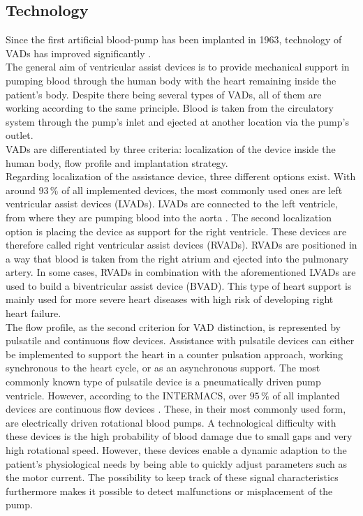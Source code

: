 \subsection{Technology}
Since the first artificial blood-pump has been implanted in 1963, technology of VADs has improved significantly \cite{VAD9}.
\\The general aim of ventricular assist devices is to provide mechanical support in pumping blood through the human body with the heart remaining inside the patient's body. Despite there being several types of VADs, all of them are working according to the same principle. Blood is taken from the circulatory system through the pump's inlet and ejected at another location via the pump's outlet. \cite{VAD1}
\\VADs are differentiated by three criteria: localization of the device inside the human body, flow profile and implantation strategy.
\\Regarding localization of the assistance device, three different options exist. With around $93\, \%$ of all implemented devices, the most commonly used ones are left ventricular assist devices (LVADs). \cite{VAD7} LVADs are connected to the left ventricle, from where they are pumping blood into the aorta \cite{VAD4}. The second localization option is placing the device as support for the right ventricle. These devices are therefore called right ventricular assist devices (RVADs). RVADs are positioned in a way that blood is taken from the right atrium and ejected into the pulmonary artery. \cite{VAD7} In some cases, RVADs in combination with the aforementioned LVADs are used to build a biventricular assist device (BVAD). This type of heart support is mainly used for more severe heart diseases with high risk of developing right heart failure. \cite{VAD11}
\\The flow profile, as the second criterion for VAD distinction, is represented by pulsatile and continuous flow devices. Assistance with pulsatile devices can either be implemented to support the heart in a counter pulsation approach, working synchronous to the heart cycle, or as an asynchronous support. The most commonly known type of pulsatile device is a pneumatically driven pump ventricle. \cite{VAD1}
However, according to the INTERMACS, over $95\, \%$ of all implanted devices are continuous flow devices \cite{VAD8}. These, in their most commonly used form, are electrically driven rotational blood pumps. A technological difficulty with these devices is the high probability of blood damage due to small gaps and very high rotational speed. However, these devices enable a dynamic adaption to the patient's physiological needs by being able to quickly adjust parameters such as the motor current. The possibility to keep track of these signal characteristics furthermore makes it possible to detect malfunctions or misplacement of the pump. \cite{VAD1}
